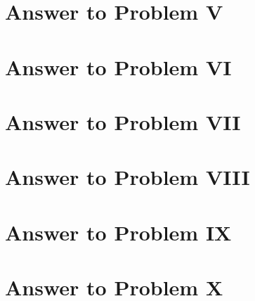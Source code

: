 \documentclass[11pt,a4paper]{article}
\begin{document}
\clearpage

\section{Answer to Problem V}\label{sec:P05}



\clearpage

\section{Answer to Problem VI}\label{sec:P06}



\clearpage

\section{Answer to Problem VII}\label{sec:P07}



\clearpage

\section{Answer to Problem VIII}\label{sec:P08}



\clearpage

\section{Answer to Problem IX}\label{sec:P09}



\clearpage

\section{Answer to Problem X}\label{sec:P10}



\clearpage
\end{document}
